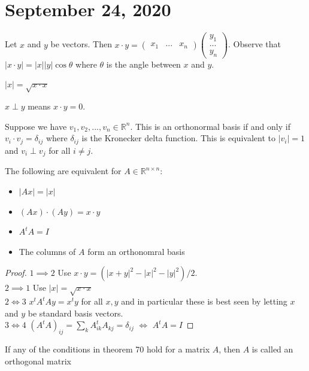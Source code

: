 \documentclass{article}
\newcommand{\R}{\mathbb{R}}
\begin{document}
\section{September 24, 2020}
\begin{definition}
Let $x$ and $y$ be vectors. Then $x\cdot y=\begin{pmatrix}
x_1&...&x_n
\end{pmatrix}\begin{pmatrix}
y_1\\...\\y_n
\end{pmatrix}$. Observe that $|x\cdot y|=|x||y|\cos\theta$ where $\theta$ is the angle between $x$ and $y$.
\end{definition}
\begin{definition}
$|x|=\sqrt{x\cdot x}$
\end{definition}
\begin{definition}
$x\perp y$ means $x\cdot y=0$. 
\end{definition}
\begin{definition}
Suppose we have $v_1,v_2,...,v_n\in \R^n$. This is an orthonormal basis if and only if $v_i\cdot v_j=\delta_{ij}$ where $\delta_{ij}$ is the Kronecker delta function. This is equivalent to $|v_i|=1$ and $v_i\perp v_j$ for all $i\neq j$. 
\end{definition}
\begin{theorem}
The following are equivalent for $A\in \R^{n\times n}$:
\begin{itemize}
    \item $|Ax|=|x|$
    \item $(Ax)\cdot(Ay)=x\cdot y$
    \item $A^tA=I$
    \item The columns of $A$ form an orthonomral basis
\end{itemize}
\end{theorem}
\begin{proof}
$1\implies 2$ Use $x\cdot y=(|x+y|^2-|x|^2-|y|^2)/2$.\\
$2\implies 1$ Use $|x|=\sqrt{x\cdot x}$\\
$2\iff 3$ $x^tA^tAy=x^ty$ for all $x,y$ and in particular these is best seen by letting $x$ and $y$ be standard basis vectors.\\
$3\iff 4$ $(A^tA)_{ij}=\sum_k A^t_{ik}A_{kj}=\delta_{ij}$ $\iff$ $A^tA=I$
\end{proof}
\begin{definition}
If any of the conditions in theorem 70 hold for a matrix $A$, then $A$ is called an orthogonal matrix
\end{definition}
\end{document}
